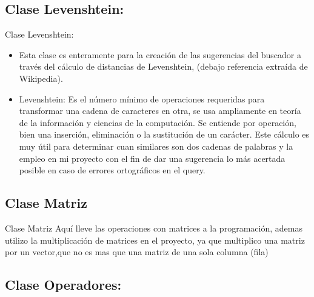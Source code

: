 \documentclass[19pt]{beamer}
\begin{document}
    
    \subsection{Clase Levenshtein:}
    
         \begin{frame}{Clase Levenshtein:}
        	\begin{itemize}
    	 \item Esta clase es enteramente para la creación de las sugerencias del buscador a través del cálculo de distancias de Levenshtein, (debajo referencia extraída de Wikipedia).

    	\item Levenshtein: Es el número mínimo de operaciones requeridas para transformar una cadena de caracteres en otra, se usa ampliamente en teoría de la información y ciencias de la computación. Se entiende por operación, bien una inserción, eliminación o la sustitución de un carácter. Este cálculo es muy útil para determinar cuan similares son dos cadenas de palabras y la empleo en mi proyecto con el fin de dar una sugerencia lo más acertada posible en caso de errores ortográficos en el query.
        \end{itemize}
        \end{frame}
        
        
   \subsection{Clase Matriz}
        
        \begin{frame}{Clase Matriz}
        Aquí lleve las operaciones con matrices a la programación, ademas utilizo la multiplicación de matrices en el proyecto, ya que multiplico una matriz por un vector,que no es mas que una matriz de una sola columna (fila)
        \end{frame}
        
        
   \subsection{Clase Operadores:}
        
\end{document}
